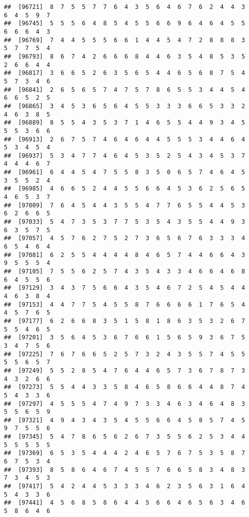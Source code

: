 \documentclass[
]{book}
\begin{document}
\begin{verbatim}
##  [96721]  8  7  5  5  7  7  6  4  3  5  6  4  6  7  6  2  4  4  3  6  4  5  9  7
##  [96745]  5  5  5  6  4  8  5  4  5  5  6  6  9  6  4  6  4  5  5  6  6  6  4  3
##  [96769]  7  4  4  5  5  5  6  6  1  4  4  5  4  7  2  8  8  8  3  5  7  7  5  4
##  [96793]  8  6  7  4  2  6  6  6  8  4  4  6  3  5  4  8  5  3  5  2  6  6  4  4
##  [96817]  3  6  6  5  2  6  3  5  6  5  4  4  6  5  6  8  7  5  4  5  7  3  4  6
##  [96841]  2  6  5  6  5  7  4  7  5  7  8  6  5  5  3  4  4  5  4  6  6  5  2  5
##  [96865]  3  4  5  3  6  5  6  4  5  5  3  3  3  6  6  5  3  3  2  4  6  3  8  5
##  [96889]  8  5  5  4  3  5  3  7  1  4  6  5  5  4  4  9  3  4  5  5  5  3  6  6
##  [96913]  2  6  7  5  7  4  6  4  6  4  4  5  5  5  3  4  4  6  4  5  3  4  5  4
##  [96937]  5  3  4  7  7  4  6  4  5  3  5  2  5  4  3  4  5  3  7  4  4  4  6  7
##  [96961]  6  4  4  5  4  7  5  5  8  3  5  0  6  5  7  4  6  4  5  3  5  5  2  4
##  [96985]  4  6  6  5  2  4  4  5  5  6  6  4  5  3  6  2  5  6  5  4  6  5  3  7
##  [97009]  7  6  4  5  4  4  3  5  5  4  7  7  6  5  5  4  4  5  3  6  2  6  6  5
##  [97033]  5  4  7  3  5  3  7  7  5  3  5  4  3  5  5  4  4  9  3  6  3  5  7  5
##  [97057]  4  5  7  6  2  7  5  2  7  3  6  5  6  7  6  3  3  3  4  6  5  4  6  4
##  [97081]  6  2  5  5  4  4  4  4  8  4  6  5  7  4  4  6  6  4  3  9  5  5  5  4
##  [97105]  7  5  5  6  2  5  7  4  3  5  4  3  3  4  6  6  4  6  8  6  4  5  5  6
##  [97129]  3  4  3  7  5  6  6  4  3  5  4  6  7  2  5  4  5  4  4  4  6  3  8  4
##  [97153]  4  4  7  7  5  4  5  5  8  7  6  6  6  6  1  7  6  5  4  4  5  7  6  5
##  [97177]  6  2  6  6  8  3  5  1  5  8  1  8  6  3  5  3  2  6  7  5  5  4  6  5
##  [97201]  3  5  6  4  5  3  6  7  6  6  1  5  6  5  9  3  6  7  5  3  4  7  5  6
##  [97225]  7  6  7  6  6  5  2  5  7  3  2  4  3  5  5  7  4  5  5  5  5  6  5  7
##  [97249]  5  5  2  8  5  4  7  6  4  4  6  5  7  3  6  7  8  7  3  4  3  2  6  6
##  [97273]  5  5  4  4  3  3  5  8  4  6  5  8  6  6  4  4  8  7  4  5  4  3  3  6
##  [97297]  4  5  5  5  4  7  4  9  7  3  3  4  6  3  4  6  4  8  3  5  5  6  5  9
##  [97321]  4  9  4  3  4  3  5  4  5  5  6  6  4  5  8  5  7  4  5  9  7  5  5  6
##  [97345]  5  4  7  8  6  5  6  2  6  7  3  5  5  6  2  5  3  4  4  5  5  5  5  5
##  [97369]  6  5  3  5  4  4  4  2  4  6  5  7  6  7  5  3  5  8  7  6  7  5  3  4
##  [97393]  8  5  8  6  4  6  7  4  5  5  7  6  6  5  8  3  4  8  3  7  3  4  5  3
##  [97417]  5  4  2  4  4  5  3  3  3  4  6  2  3  5  6  3  1  6  4  5  4  3  3  6
##  [97441]  4  5  6  8  5  8  6  4  4  5  6  6  4  6  5  6  3  4  6  5  8  6  4  6

\end{verbatim}
\end{document}
